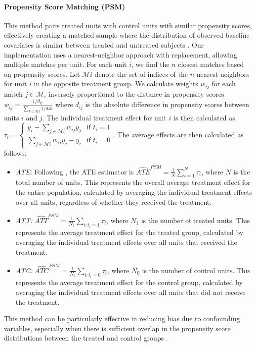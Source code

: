 \documentclass{article}
\begin{document}
\paragraph{Propensity Score Matching (PSM)} This method pairs treated units with control units with similar propensity scores, effectively creating a matched sample where the distribution of observed baseline covariates is similar between treated and untreated subjects \citep{austin2011introduction}. Our implementation uses a nearest-neighbor approach with replacement, allowing multiple matches per unit. For each unit $i$, we find the $n$ closest matches based on propensity scores. Let $\mathcal{M}i$ denote the set of indices of the $n$ nearest neighbors for unit $i$ in the opposite treatment group. We calculate weights $w_{ij}$ for each match $j \in \mathcal{M}_i$ inversely proportional to the distance in propensity scores 
$w_{ij} = \frac{1/d_{ij}}{\sum_{k \in \mathcal{M}i} 1/d{ik}}$
where $d_{ij}$ is the absolute difference in propensity scores between units $i$ and $j$. The individual treatment effect for unit $i$ is then calculated as
$\tau_i = \begin{cases}
y_i - \sum_{j \in \mathcal{M}i} w_{ij}y_j & \text{if } t_i = 1 \\
\sum_{j \in \mathcal{M}i} w_{ij}y_j - y_i & \text{if } t_i = 0
\end{cases}
$.
The average effects are then calculated as follows:
\begin{itemize}
\item \textit{ATE:} Following \citet{basu2023understanding}, the ATE estimator is $\widehat{ATE}^{PSM} = \frac{1}{N} \sum_{i=1}^N \tau_i$, where $N$ is the total number of units. This represents the overall average treatment effect for the entire population, calculated by averaging the individual treatment effects over all units, regardless of whether they received the treatment.

\item \textit{ATT:} $\widehat{ATT}^{PSM} = \frac{1}{N_1} \sum_{i:t_i=1} \tau_i$, where $N_1$ is the number of treated units. This represents the average treatment effect for the treated group, calculated by averaging the individual treatment effects over all units that received the treatment.

\item \textit{ATC:} $\widehat{ATC}^{PSM} = \frac{1}{N_0} \sum_{i:t_i=0} \tau_i$, where $N_0$ is the number of control units. This represents the average treatment effect for the control group, calculated by averaging the individual treatment effects over all units that did not receive the treatment.

\end{itemize}
This method can be particularly effective in reducing bias due to confounding variables, especially when there is sufficient overlap in the propensity score distributions between the treated and control groups \citep{rosenbaum1983central}.
\end{document}
